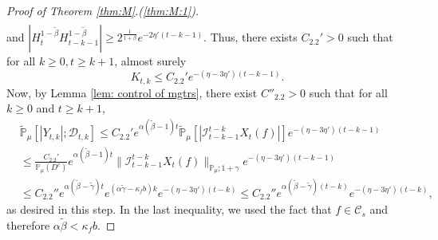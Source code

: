 \documentclass[12pt,a4paper]{amsart}
\theoremstyle{plain}
\theoremstyle{definition}
\numberwithin{equation}{section}
\begin{document}
\begin{proof}[Proof of Theorem \ref{thm:M}.(\ref{thm:M:1})]
\begin{align}
  \end{align}
  and
  $
    |H_t^{1 - \tilde \beta} H_{t-k-1}^{ 1 - \tilde \beta}|
    \geq 2^{\frac{1}{1+\beta}} e^{-2\eta'(t-k-1)}.
  $
  Thus, there exists  $C_{2.2}'> 0$ such that for all $k \geq 0, t\geq k+1$, almost surely
  \begin{equation}
    \label{ineq: control of Kkt}
    K_{t,k}
    \leq C_{2.2}' e^{-(\eta - 3\eta')(t-k-1)}.
  \end{equation}
  Now, by Lemma \ref{lem: control of mgtrs}, there exist $C''_{2.2}>0$ such that for all $k\geq 0$ and $t\geq k+1$,
  \begin{align}
    \label{eq: Y in D}
    & \mathbb{\widetilde{P}}_{\mu} [|Y_{t,k}| ; \mathcal{D}_{t,k} ]
    \leq C_{2.2}' e^{\alpha (\tilde \beta - 1)t} \mathbb{\widetilde{P}}_{\mu} [ | \mathcal{I}_{t-k-1}^{t-k}X_t(f)| ] e^{-(\eta - 3\eta')(t-k-1)} \\
    & \leq \frac{C_{2.2}' } {\mathbb{P}_{\mu}(D^c)} e^{ \alpha (\tilde \beta - 1)t} \|\mathcal{I}_{t-k-1}^{t-k} X_t(f)\|_{\mathbb P_\mu; 1+\gamma} e^{-(\eta - 3\eta')(t-k - 1)} \\
    & \leq C_{2.2}'' e^{\alpha(\tilde \beta - \tilde \gamma)t} e^{ (\alpha \tilde \gamma - \kappa_f b)k} e^{-(\eta - 3\eta')(t-k)}
     \leq C_{2.2}'' e^{\alpha(\tilde \beta - \tilde \gamma)(t-k)} e^{-(\eta - 3\eta')(t-k)},
  \end{align}
  as desired in this step.
  In the last inequality, we used the fact that $f\in \mathcal C_s$ and therefore $\alpha \tilde \beta < \kappa_f b$.



\end{proof}
\end{document}
